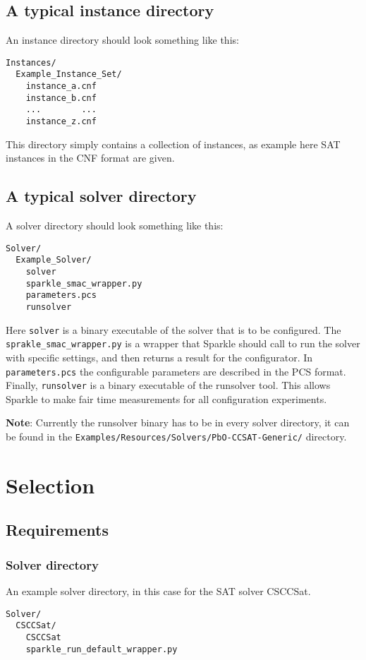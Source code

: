 \documentclass{article}
\begin{document}
\subsection{A typical instance directory}
\label{dir:instances}

An instance directory should look something like this:

\begin{verbatim}
Instances/
  Example_Instance_Set/
    instance_a.cnf
    instance_b.cnf
    ...        ...
    instance_z.cnf
\end{verbatim}

This directory simply contains a collection of instances, as example here SAT instances in the CNF format are given.

\subsection{A typical solver directory}
\label{dir:solvers}

A solver directory should look something like this:

\begin{verbatim}
Solver/
  Example_Solver/
    solver
    sparkle_smac_wrapper.py
    parameters.pcs
    runsolver
\end{verbatim}

Here \texttt{solver} is a binary executable of the solver that is to be configured. The \texttt{sprakle\_smac\_wrapper.py} is a wrapper that Sparkle should call to run the solver with specific settings, and then returns a result for the configurator. In \texttt{parameters.pcs} the configurable parameters are described in the PCS format. Finally, \texttt{runsolver} is a binary executable of the runsolver tool. This allows Sparkle to make fair time measurements for all configuration experiments.

\textbf{Note}: Currently the runsolver binary has to be in every solver directory, it can be found in the \texttt{Examples/Resources/Solvers/PbO-CCSAT-Generic/} directory. 

\section{Selection}

\subsection{Requirements}

\subsubsection{Solver directory}
An example solver directory, in this case for the SAT solver CSCCSat.
\begin{verbatim}
Solver/
  CSCCSat/
    CSCCSat
    sparkle_run_default_wrapper.py
\end{verbatim}
\end{document}
